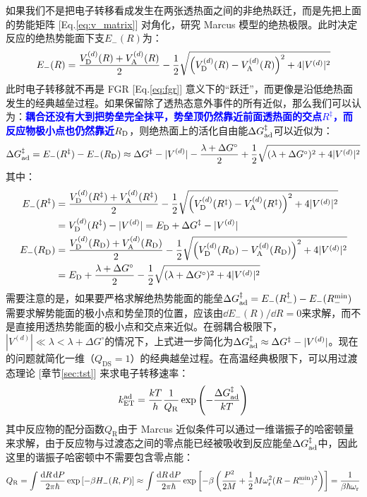 如果我们不是把电子转移看成发生在两张透热面之间的非绝热跃迁，而是先把上面的势能矩阵 [Eq.\eqref{eq:v_matrix}] 对角化，研究 Marcus 模型的绝热极限。此时决定反应的绝热势能面下支$E_-(R)$为：
\[
E_{-}(R)=\frac{V_{\rm D}^{(d)}(R)+V_{\rm A}^{(d)}(R)}{2}-\frac{1}{2}\sqrt{\left(V_{\rm D}^{(d)}(R)-V_{\rm A}^{(d)}(R)\right)^2+4|V^{(d)}|^2}
\]
此时电子转移就不再是 FGR [Eq.\eqref{eq:fgr}] 意义下的“跃迁”，而更像是沿低绝热面发生的经典越垒过程。如果保留除了透热态意外事件的所有近似，那么我们可以认为：\textcolor{blue}{\textbf{耦合还没有大到把势垒完全抹平，势垒顶仍然靠近前面透热面的交点$R^\ddagger$，而反应物极小点也仍然靠近$R_{\rm D}$}}，则绝热面上的活化自由能$\Delta G_{\rm ad}^{\ddagger}$可以近似为：
\[\Delta G_{\rm ad}^{\ddagger}=E_-(R^{\ddagger})-E_-(R_{\rm D})\approx \Delta G^\ddagger-|V^{(d)}|-\frac{\lambda+\Delta G^\circ}{2}
+\frac{1}{2}\sqrt{(\lambda+\Delta G^\circ)^2+4|V^{(d)}|^2}\]
其中：
\[\begin{aligned}
E_-(R^\ddagger)
&=\frac{V_{\rm D}^{(d)}(R^\ddagger)+V_{\rm A}^{(d)}(R^\ddagger)}{2}
-\frac{1}{2}\sqrt{\left(V_{\rm D}^{(d)}(R^\ddagger)-V_{\rm A}^{(d)}(R^\ddagger)\right)^2+4|V^{(d)}|^2}\\
&=V_{\rm D}^{(d)}(R^\ddagger)-|V^{(d)}|=E_{\rm D}+\Delta G^\ddagger-|V^{(d)}|\\
E_-(R_{\rm D})
&=\frac{V_{\rm D}^{(d)}(R_{\rm D})+V_{\rm A}^{(d)}(R_{\rm D})}{2}-\frac{1}{2}\sqrt{\left(V_{\rm D}^{(d)}(R_{\rm D})-V_{\rm A}^{(d)}(R_{\rm D})\right)^2+4|V^{(d)}|^2}\\
&=E_{\rm D}+\frac{\lambda+\Delta G^\circ}{2}-\frac{1}{2}\sqrt{(\lambda+\Delta G^\circ)^2+4|V^{(d)}|^2}
\end{aligned}\]
需要注意的是，如果要严格求解绝热势能面的能垒$\Delta G_{\rm ad}^{\ddagger}=E_-(R_-^{\ddagger})-E_-(R_-^{\rm min})$需要求解势能面的极小点和势垒顶的位置，应该由$\dd{E_-(R)}/\dd{R}=0$来求解，而不是直接用透热势能面的极小点和交点来近似。在弱耦合极限下，$|V^{(d)}|\ll\lambda<\lambda+\Delta G^\circ$的情况下，上式进一步简化为$\Delta G_{\rm ad}^{\ddagger}\approx \Delta G^\ddagger-|V^{(d)}|$。现在的问题就简化一维（$Q_{\mathrm{DS}}=1$）的经典越垒过程。在高温经典极限下，可以用过渡态理论 [章节\ref{sec:tst}] 来求电子转移速率：
\[k_{\rm ET}^{\rm ad}=\frac{kT}{h} \frac{1}{Q_{\mathrm{R}}} \exp\left(-\frac{\Delta G_{\rm ad}^{\ddagger}}{kT}\right)\]
其中反应物的配分函数$Q_{\mathrm{R}}$由于 Marcus 近似条件可以通过一维谐振子的哈密顿量来求解，由于反应物与过渡态之间的零点能已经被吸收到反应能垒$\Delta G_{\rm ad}^{\ddagger}$中，因此这里的谐振子哈密顿中不需要包含零点能：
\[Q_{\mathrm{R}}=\int\frac{\dd{R}\dd{P}}{2\pi\hbar}\exp\left[-\beta H_-(R,P)\right]\approx\int\frac{\dd{R}\dd{P}}{2\pi\hbar}\exp\left[-\beta\left(\frac{P^2}{2M}+\frac{1}{2}M\omega_{\rm r}^2(R-R_-^{\rm min})^2\right)\right]=\frac{1}{\beta\hbar\omega_{\rm r}}\]

